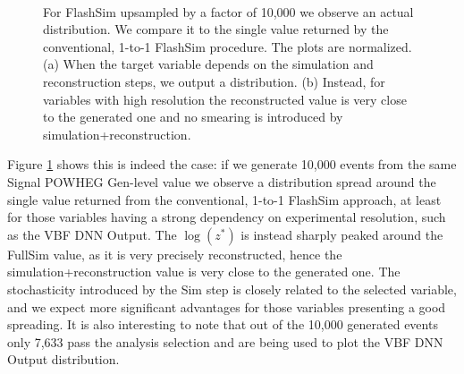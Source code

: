     \begin{figure}
   \myfloatalign
    \\
    \caption[Upsampling]{For FlashSim upsampled by a factor of 10,000 we observe an actual distribution. We compare it to the single value returned by the conventional, 1-to-1 FlashSim procedure. The plots are normalized. (a) When the target variable depends on the simulation and reconstruction steps, we output a distribution. (b) Instead, for variables with high resolution the reconstructed value is very close to the generated one and no smearing is introduced by simulation+reconstruction.}
    \label{fig:1upHMM}
   \end{figure}
   
   Figure \ref{fig:1upHMM} shows this is indeed the case: if we generate 10,000 events from the same Signal POWHEG Gen-level value we observe a distribution spread around the single value returned from the conventional, 1-to-1 FlashSim approach, at least for those variables having a strong dependency on experimental resolution, such as the VBF DNN Output. The $\log(z^*)$ is instead sharply peaked around the FullSim value, as it is very precisely reconstructed, hence the simulation+reconstruction value is very close to the generated one. The stochasticity introduced by the Sim step is closely related to the selected variable, and we expect more significant advantages for those variables presenting a good spreading.
   It is also interesting to note that out of the 10,000 generated events only 7,633 pass the analysis selection and are being used to plot the VBF DNN Output distribution.
   
